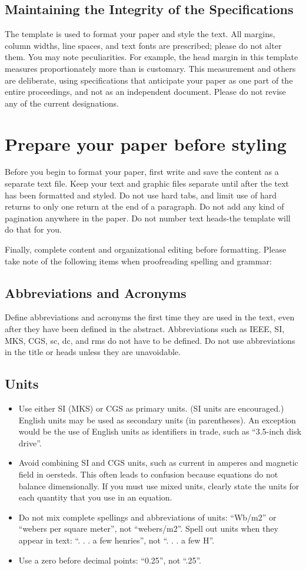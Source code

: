 \documentclass[9pt, conference, a4paper, compsocconf]{IEEEtran}
\begin{document}
\subsection{Maintaining the Integrity of the Specifications}
The template is used to format your paper and style the text. All margins, column widths, line spaces, and text fonts are prescribed; please do not alter them. You may note peculiarities. For example, the head margin in this template measures proportionately more than is customary. This measurement and others are deliberate, using specifications that anticipate your paper as one part of the entire proceedings, and not as an independent document. Please do not revise any of the current designations.

\section{Prepare your paper before styling}
Before you begin to format your paper, first write and save the content as a separate text file. Keep your text and graphic files separate until after the text has been formatted and styled. Do not use hard tabs, and limit use of hard returns to only one return at the end of a paragraph. Do not add any kind of pagination anywhere in the paper. Do not number text heads-the template will do that for you.


Finally, complete content and organizational editing before formatting. Please take note of the following items when proofreading spelling and grammar:
\subsection{Abbreviations and Acronyms}
Define abbreviations and acronyms the first time they are used in the text, even after they have been defined in the abstract. Abbreviations such as IEEE, SI, MKS, CGS, sc, dc, and rms do not have to be defined. Do not use abbreviations in the title or heads unless they are unavoidable.
\subsection{Units}
\begin{itemize}
\item Use either SI (MKS) or CGS as primary units. (SI units are encouraged.) English units may be used as secondary units (in parentheses). An exception would be the use of English units as identifiers in trade, such as “3.5-inch disk drive”.
\item Avoid combining SI and CGS units, such as current in amperes and magnetic field in oersteds. This often leads to confusion because equations do not balance dimensionally. If you must use mixed units, clearly state the units for each quantity that you use in an equation.
\item Do not mix complete spellings and abbreviations of units: “Wb/m2” or “webers per square meter”, not “webers/m2”.  Spell out units when they appear in text: “. . . a few henries”, not “. . . a few H”.
\item Use a zero before decimal points: “0.25”, not “.25”.
\end{itemize}
\end{document}
